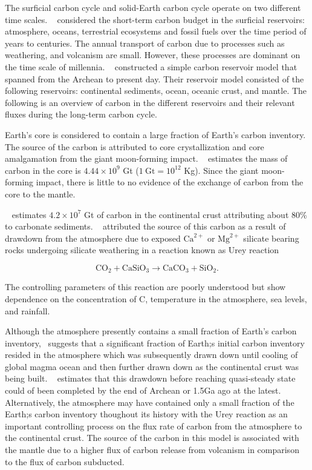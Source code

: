 The surficial carbon cycle and solid-Earth carbon cycle operate on two different time scales. ~\cite{HRA:2007} considered the short-term carbon budget in the surficial reservoirs: atmosphere, oceans, terrestrial ecosystems and fossil fuels over the time period of years to centuries. The annual transport of carbon due to processes such as weathering, and volcanism are small. However, these processes are dominant on the time scale of millennia. ~\citet{SNH-ZK:2001} constructed a simple carbon reservoir model that spanned from the Archean to present day. Their reservoir model consisted of the following reservoirs: continental sediments, ocean, oceanic crust, and mantle. The following is an overview of carbon in the different reservoirs and their relevant fluxes during the long-term carbon cycle.

Earth's core is considered to contain a large fraction of Earth's carbon inventory. The source of the carbon is attributed to core crystallization and core amalgamation from the giant moon-forming impact. ~\cite{DR-CH-SN:2013} estimates the mass of carbon in the core is $4.44 \times 10^9$ Gt ($1~\text{Gt} = 10^{12}$ Kg). Since the giant moon-forming impact, there is little to no evidence of the exchange of carbon from the core to the mantle. 



~\citet{KHW:1995} estimates $4.2 \times 10^7$ Gt of carbon in the continental crust attributing about 80\% to carbonate sediments. ~\citet{UHC:1952} attributed the source of this carbon as a result of drawdown from the atmosphere due to exposed $\mathrm{Ca}^{2+}$ or $\mathrm{Mg}^{2+}$ silicate bearing rocks undergoing silicate weathering in a reaction known as Urey reaction~\cite{UHC:1952}

\begin{equation}
\label{EQ:Urey_reaction}
  \text{CO}_2 + \text{CaSiO}_3 \rightarrow \text{CaCO}_3 + \text{SiO}_2.
\end{equation}

\noindent The controlling parameters of this reaction are poorly understood but show dependence on the concentration of C, temperature in the atmosphere, sea levels, and rainfall.  

Although the atmosphere presently contains a small fraction of Earth's carbon inventory,~\citet{KJD:2002} suggests that a significant fraction of Earth;s initial carbon inventory resided in the atmosphere which was subsequently drawn down until cooling of global magma ocean and then further drawn down as the continental crust was being built. ~\citet{KHD:2002} estimates that this drawdown before reaching quasi-steady state could of been completed by the end of Archean or 1.5Ga ago at the latest. Alternatively, the atmosphere may have contained only a small fraction of the Earth;s carbon inventory thoughout its history with the Urey reaction as an important controlling process on the flux rate of carbon from the atmosphere to the continental crust. The source of the carbon in this model is associated with the mantle due to a higher flux of carbon release from volcanism in comparison to the flux of carbon subducted.

